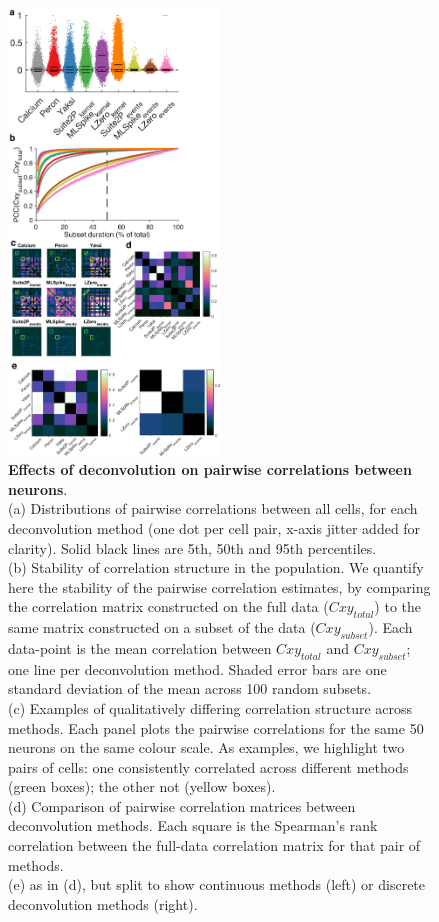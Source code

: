 \documentclass[a4paper,11pt]{article}
\begin{document}
\begin{figure}
	\centering
	\includegraphics[width=0.5\textwidth]{composite_figs/fig7_correlations}
	\caption {\label{fig:cxy_dist} \textbf{Effects of deconvolution on pairwise correlations between neurons}. \\ 
		(a) Distributions of pairwise correlations between all cells, for each deconvolution method (one dot per cell pair, x-axis jitter added for clarity). Solid black lines are 5th, 50th and 95th percentiles. \\
		(b) Stability of correlation structure in the population. We quantify here the stability of the pairwise correlation estimates, by comparing the correlation matrix constructed on the full data ($Cxy_{total}$) to the same matrix constructed on a subset of the data ($Cxy_{subset}$). Each data-point is the mean correlation between $Cxy_{total}$ and $Cxy_{subset}$; one line per deconvolution method. Shaded error bars are one standard deviation of the mean across 100 random subsets.\\
		(c) Examples of qualitatively differing correlation structure across methods. Each panel plots the pairwise correlations for the same 50 neurons on the same colour scale. As examples, we highlight two pairs of cells: one consistently correlated across different methods (green boxes); the other not (yellow boxes). \\
		(d) Comparison of pairwise correlation matrices between deconvolution methods. Each square is the Spearman's rank correlation between the full-data correlation matrix for that pair of methods. \\
		(e) as in (d), but split to show continuous methods (left) or discrete deconvolution methods (right).
	}
\end{figure}
 
\end{document}
